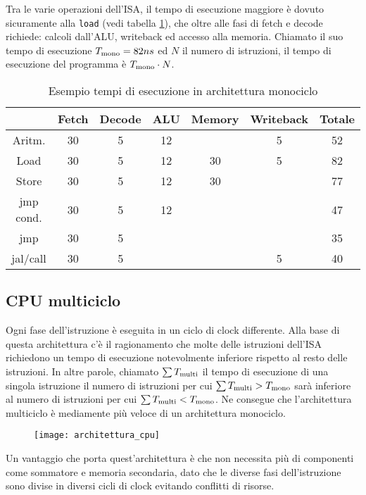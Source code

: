 \documentclass[../ace.tex]{subfiles}
\begin{document}
Tra le varie operazioni dell'ISA, il tempo di esecuzione maggiore è dovuto sicuramente alla \lstinline{load} (vedi tabella \ref{tab:tempi_esecuzione_monociclo}),
che oltre alle fasi di fetch e decode richiede: calcoli dall'ALU, writeback ed accesso alla memoria.
Chiamato il suo tempo di esecuzione $T_\text{mono}=82ns$ ed $N$ il numero di istruzioni, il tempo di esecuzione del programma è $T_\text{mono} \cdot N$.

\begin{table}[h]
    \centering
    \begin{tabular}{|c|c|c|c|c|c|c|}
        \hline
    & Fetch  & Decode & ALU & Memory & Writeback & Totale \\
    \hline
        Aritm.   & 30 & 5 &  12 &        &         5 &      52\\
        Load     & 30 & 5 &  12 &     30 &         5 &      82\\
        Store    & 30 & 5 &  12 &     30 &           &      77\\
        jmp cond.& 30 & 5 &  12 &        &           &      47\\
        jmp      & 30 & 5 &     &        &           &      35\\
        jal/call & 30 & 5 &     &        &         5 &      40\\
        \hline
    \end{tabular}
    \caption{Esempio tempi di esecuzione in architettura monociclo}
    \label{tab:tempi_esecuzione_monociclo}
\end{table}

\subsection{CPU multiciclo}
Ogni fase dell'istruzione è eseguita in un ciclo di clock differente.
Alla base di questa architettura c'è il ragionamento che molte delle istruzioni dell'ISA richiedono un tempo di esecuzione notevolmente inferiore rispetto al resto delle istruzioni.
In altre parole, chiamato $\sum T_\text{multi}$ il tempo di esecuzione di una singola istruzione il numero di istruzioni per cui
$\sum T_\text{multi} > T_\text{mono}$ sarà inferiore al numero di istruzioni per cui $\sum T_\text{multi} < T_\text{mono}$.
Ne consegue che l'architettura multiciclo è mediamente più veloce di un architettura monociclo.

\begin{figure}[h]
    \centering
    \texttt{[image: architettura\_cpu]}
\end{figure}
Un vantaggio che porta quest'architettura è che non necessita più di componenti come sommatore e memoria secondaria, dato che le diverse fasi dell'istruzione sono divise in diversi cicli di clock evitando conflitti di risorse.
\end{document}

